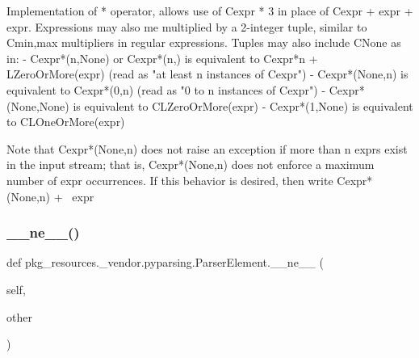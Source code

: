 \begin{DoxyVerb}Implementation of * operator, allows use of C{expr * 3} in place of
C{expr + expr + expr}.  Expressions may also me multiplied by a 2-integer
tuple, similar to C{{min,max}} multipliers in regular expressions.  Tuples
may also include C{None} as in:
 - C{expr*(n,None)} or C{expr*(n,)} is equivalent
      to C{expr*n + L{ZeroOrMore}(expr)}
      (read as "at least n instances of C{expr}")
 - C{expr*(None,n)} is equivalent to C{expr*(0,n)}
      (read as "0 to n instances of C{expr}")
 - C{expr*(None,None)} is equivalent to C{L{ZeroOrMore}(expr)}
 - C{expr*(1,None)} is equivalent to C{L{OneOrMore}(expr)}

Note that C{expr*(None,n)} does not raise an exception if
more than n exprs exist in the input stream; that is,
C{expr*(None,n)} does not enforce a maximum number of expr
occurrences.  If this behavior is desired, then write
C{expr*(None,n) + ~expr}
\end{DoxyVerb}
 \mbox{\label{classpkg__resources_1_1__vendor_1_1pyparsing_1_1ParserElement_a4220b00deac3bef5d1766e2014b72881}} 
\subsubsection{\texorpdfstring{\+\_\+\+\_\+ne\+\_\+\+\_\+()}{\_\_ne\_\_()}}
{\footnotesize\ttfamily def pkg\+\_\+resources.\+\_\+vendor.\+pyparsing.\+Parser\+Element.\+\_\+\+\_\+ne\+\_\+\+\_\+ (\begin{DoxyParamCaption}\item[{}]{self,  }\item[{}]{other }\end{DoxyParamCaption})}

\mbox{\label{classpkg__resources_1_1__vendor_1_1pyparsing_1_1ParserElement_a788f11bd1e90390125a501e74e786fe9}} 
